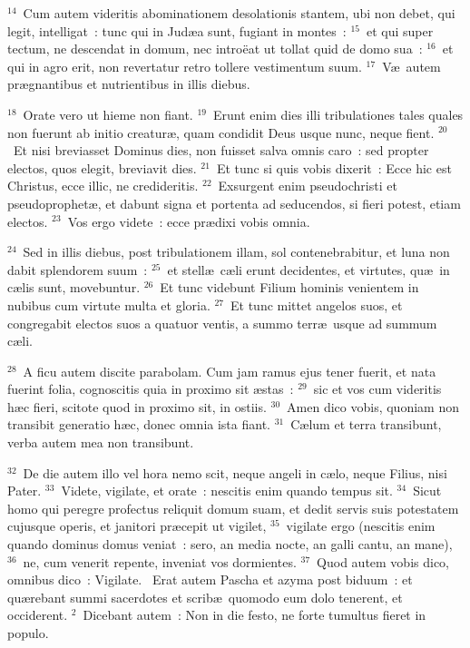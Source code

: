 ${}^{14}$~Cum autem videritis abominationem desolationis stantem, ubi non debet, qui legit, intelligat~: tunc qui in Jud\ae a sunt, fugiant in montes~:
${}^{15}$~et qui super tectum, ne descendat in domum, nec intro\"eat ut tollat quid de domo sua~:
${}^{16}$~et qui in agro erit, non revertatur retro tollere vestimentum suum.
${}^{17}$~V\ae\ autem pr\ae gnantibus et nutrientibus in illis diebus.


${}^{18}$~Orate vero ut hieme non fiant.
${}^{19}$~Erunt enim dies illi tribulationes tales quales non fuerunt ab initio creatur\ae , quam condidit Deus usque nunc, neque fient.
${}^{20}$~Et nisi breviasset Dominus dies, non fuisset salva omnis caro~: sed propter electos, quos elegit, breviavit dies.
${}^{21}$~Et tunc si quis vobis dixerit~: Ecce hic est Christus, ecce illic, ne credideritis.
${}^{22}$~Exsurgent enim pseudochristi et pseudoprophet\ae , et dabunt signa et portenta ad seducendos, si fieri potest, etiam electos.
${}^{23}$~Vos ergo videte~: ecce pr\ae dixi vobis omnia.


${}^{24}$~Sed in illis diebus, post tribulationem illam, sol contenebrabitur, et luna non dabit splendorem suum~:
${}^{25}$~et stell\ae\ c\ae li erunt decidentes, et virtutes, qu\ae\ in c\ae lis sunt, movebuntur.
${}^{26}$~Et tunc videbunt Filium hominis venientem in nubibus cum virtute multa et gloria.
${}^{27}$~Et tunc mittet angelos suos, et congregabit electos suos a quatuor ventis, a summo terr\ae\ usque ad summum c\ae li.


${}^{28}$~A ficu autem discite parabolam. Cum jam ramus ejus tener fuerit, et nata fuerint folia, cognoscitis quia in proximo sit \ae stas~:
${}^{29}$~sic et vos cum videritis h\ae c fieri, scitote quod in proximo sit, in ostiis.
${}^{30}$~Amen dico vobis, quoniam non transibit generatio h\ae c, donec omnia ista fiant.
${}^{31}$~C\ae lum et terra transibunt, verba autem mea non transibunt.


${}^{32}$~De die autem illo vel hora nemo scit, neque angeli in c\ae lo, neque Filius, nisi Pater.
${}^{33}$~Videte, vigilate, et orate~: nescitis enim quando tempus sit.
${}^{34}$~Sicut homo qui peregre profectus reliquit domum suam, et dedit servis suis potestatem cujusque operis, et janitori pr\ae cepit ut vigilet,
${}^{35}$~vigilate ergo (nescitis enim quando dominus domus veniat~: sero, an media nocte, an galli cantu, an mane),
${}^{36}$~ne, cum venerit repente, inveniat vos dormientes.
${}^{37}$~Quod autem vobis dico, omnibus dico~: Vigilate.
~\lettrine[lines=10,image=true,loversize=0.05,lraise=-0.03]{E}{}rat autem Pascha et azyma post biduum~: et qu\ae rebant summi sacerdotes et scrib\ae\ quomodo eum dolo tenerent, et occiderent.
${}^{2}$~Dicebant autem~: Non in die festo, ne forte tumultus fieret in populo.


